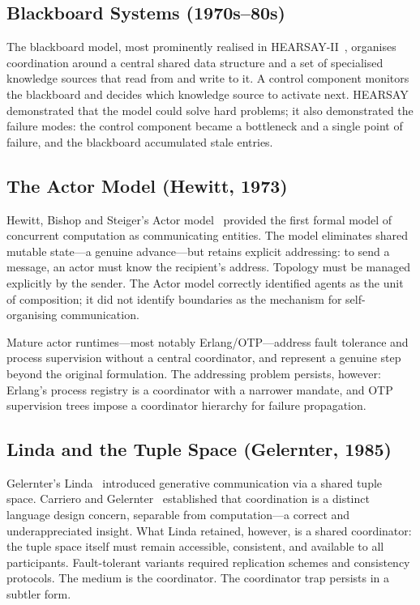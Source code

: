 \documentclass[11pt]{article}
\begin{document}
\subsection{Blackboard Systems (1970s--80s)}

The blackboard model, most prominently realised in HEARSAY-II~\cite{hearsay},
organises coordination around a central shared data structure and a set of
specialised knowledge sources that read from and write to it. A control component
monitors the blackboard and decides which knowledge source to activate next.
HEARSAY demonstrated that the model could solve hard problems; it also
demonstrated the failure modes: the control component became a bottleneck and a
single point of failure, and the blackboard accumulated stale entries.

\subsection{The Actor Model (Hewitt, 1973)}

Hewitt, Bishop and Steiger's Actor model~\cite{hewitt} provided the first formal
model of concurrent computation as communicating entities. The model eliminates
shared mutable state---a genuine advance---but retains explicit addressing: to
send a message, an actor must know the recipient's address. Topology must be
managed explicitly by the sender. The Actor model correctly identified agents as
the unit of composition; it did not identify boundaries as the mechanism for
self-organising communication.

Mature actor runtimes---most notably Erlang/OTP---address fault tolerance and
process supervision without a central coordinator, and represent a genuine step
beyond the original formulation. The addressing problem persists, however:
Erlang's process registry is a coordinator with a narrower mandate, and OTP
supervision trees impose a coordinator hierarchy for failure propagation.

\subsection{Linda and the Tuple Space (Gelernter, 1985)}

Gelernter's Linda~\cite{linda} introduced generative communication via a shared
tuple space. Carriero and Gelernter~\cite{linda-coord} established that
coordination is a distinct language design concern, separable from
computation---a correct and underappreciated insight. What Linda retained,
however, is a shared coordinator: the tuple space itself must remain accessible,
consistent, and available to all participants. Fault-tolerant variants required
replication schemes and consistency protocols. The medium is the coordinator. The
coordinator trap persists in a subtler form.
\end{document}
